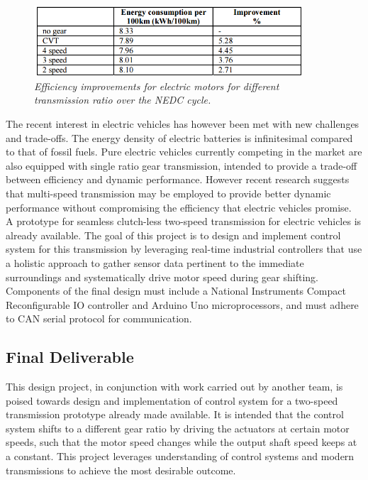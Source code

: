 \documentclass{article}
\begin{document}
\begin{figure}[!ht]
\centering 
\includegraphics[width=10cm]{fig_1.png}
\caption{\small \sl Efficiency improvements for electric motors for different transmission ratio over the NEDC cycle.}  
\end{figure}


\noindent The recent interest in electric vehicles has however been met with new challenges and trade-offs. The energy density of electric batteries is infinitesimal compared to that of fossil fuels. Pure electric vehicles currently competing in the market are also equipped with single ratio gear transmission, intended to provide a trade-off between efficiency and dynamic performance. However recent research suggests that multi-speed transmission may be employed to provide better dynamic performance without compromising the efficiency that electric vehicles promise.\\


\noindent A prototype for seamless clutch-less two-speed transmission for electric vehicles is already available. The goal of this project is to design and implement control system for this transmission by leveraging real-time industrial controllers that use a holistic approach to gather sensor data pertinent to the immediate surroundings and systematically drive motor speed during gear shifting. Components of the final design must include a National Instruments Compact Reconfigurable IO controller and Arduino Uno microprocessors, and must adhere to CAN serial protocol for communication.\\

\subsection{Final Deliverable}
This design project, in conjunction with work carried out by another team, is poised towards design and implementation of control system for a two-speed transmission prototype already made available. It is intended that the control system shifts to a different gear ratio by driving the actuators at certain motor speeds, such that the motor speed changes while the output shaft speed keeps at a constant. This project leverages understanding of control systems and modern transmissions to achieve the most desirable outcome.\\
\end{document}
